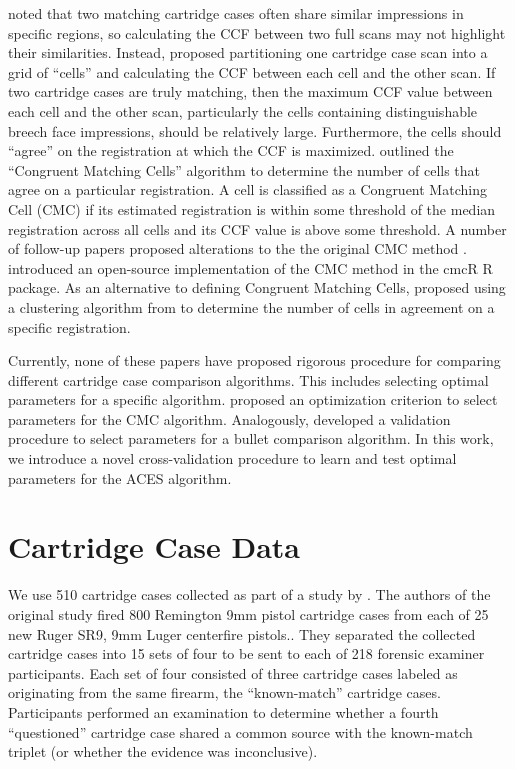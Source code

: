 \documentclass[11pt,]{isuthesis}
\begin{document}
\citet{song_proposed_2013} noted that two matching cartridge cases often share similar impressions in specific regions, so calculating the CCF between two full scans may not highlight their similarities.
Instead, \citet{song_proposed_2013} proposed partitioning one cartridge case scan into a grid of ``cells'' and calculating the CCF between each cell and the other scan.
If two cartridge cases are truly matching, then the maximum CCF value between each cell and the other scan, particularly the cells containing distinguishable breech face impressions, should be relatively large.
Furthermore, the cells should ``agree'' on the registration at which the CCF is maximized.
\citet{song_proposed_2013} outlined the ``Congruent Matching Cells'' algorithm to determine the number of cells that agree on a particular registration.
A cell is classified as a Congruent Matching Cell (CMC) if its estimated registration is within some threshold of the median registration across all cells and its CCF value is above some threshold.
A number of follow-up papers proposed alterations to the the original CMC method \citep{tong_improved_2015, chen_convergence_2017}.
\citet{cmcR} introduced an open-source implementation of the CMC method in the cmcR R package.
As an alternative to defining Congruent Matching Cells, \citet{zhang_convergence_2021} proposed using a clustering algorithm from \citet{Ester1996} to determine the number of cells in agreement on a specific registration.

Currently, none of these papers have proposed rigorous procedure for comparing different cartridge case comparison algorithms.
This includes selecting optimal parameters for a specific algorithm.
\citet{Zemmels2023} proposed an optimization criterion to select parameters for the CMC algorithm.
Analogously, \citet{hare_automatic_2016} developed a validation procedure to select parameters for a bullet comparison algorithm.
In this work, we introduce a novel cross-validation procedure to learn and test optimal parameters for the ACES algorithm.

\hypertarget{cartridge-case-data}{%
\section{Cartridge Case Data}\label{cartridge-case-data}}

We use 510 cartridge cases collected as part of a study by \citet{Baldwin2014}.
The authors of the original study fired 800 Remington 9mm pistol cartridge cases from each of 25 new Ruger SR9, 9mm Luger centerfire pistols..
They separated the collected cartridge cases into 15 sets of four to be sent to each of 218 forensic examiner participants.
Each set of four consisted of three cartridge cases labeled as originating from the same firearm, the ``known-match'' cartridge cases.
Participants performed an examination to determine whether a fourth ``questioned'' cartridge case shared a common source with the known-match triplet (or whether the evidence was inconclusive).
\end{document}
